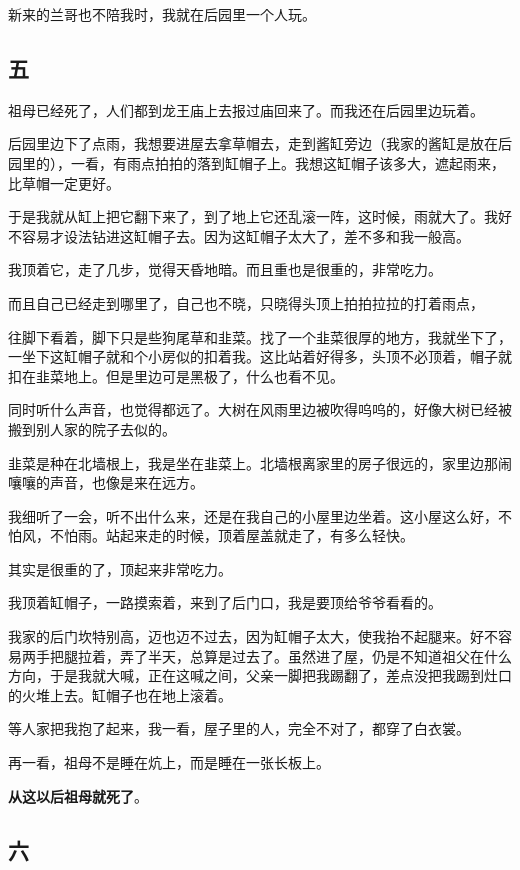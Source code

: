 \documentclass[UTF8]{ctexart}
\begin{document}
新来的兰哥也不陪我时，我就在后园里一个人玩。

\subsection{五}

祖母已经死了，人们都到龙王庙上去报过庙回来了。而我还在后园里边玩着。

后园里边下了点雨，我想要进屋去拿草帽去，走到酱缸旁边（我家的酱缸是放在后园里的），一看，有雨点拍拍的落到缸帽子上。我想这缸帽子该多大，遮起雨来，比草帽一定更好。

于是我就从缸上把它翻下来了，到了地上它还乱滚一阵，这时候，雨就大了。我好不容易才设法钻进这缸帽子去。因为这缸帽子太大了，差不多和我一般高。

我顶着它，走了几步，觉得天昏地暗。而且重也是很重的，非常吃力。

而且自己已经走到哪里了，自己也不晓，只晓得头顶上拍拍拉拉的打着雨点，

往脚下看着，脚下只是些狗尾草和韭菜。找了一个韭菜很厚的地方，我就坐下了，一坐下这缸帽子就和个小房似的扣着我。这比站着好得多，头顶不必顶着，帽子就扣在韭菜地上。但是里边可是黑极了，什么也看不见。

同时听什么声音，也觉得都远了。大树在风雨里边被吹得呜呜的，好像大树已经被搬到别人家的院子去似的。

韭菜是种在北墙根上，我是坐在韭菜上。北墙根离家里的房子很远的，家里边那闹嚷嚷的声音，也像是来在远方。

我细听了一会，听不出什么来，还是在我自己的小屋里边坐着。这小屋这么好，不怕风，不怕雨。站起来走的时候，顶着屋盖就走了，有多么轻快。

其实是很重的了，顶起来非常吃力。

我顶着缸帽子，一路摸索着，来到了后门口，我是要顶给爷爷看看的。

我家的后门坎特别高，迈也迈不过去，因为缸帽子太大，使我抬不起腿来。好不容易两手把腿拉着，弄了半天，总算是过去了。虽然进了屋，仍是不知道祖父在什么方向，于是我就大喊，正在这喊之间，父亲一脚把我踢翻了，差点没把我踢到灶口的火堆上去。缸帽子也在地上滚着。

等人家把我抱了起来，我一看，屋子里的人，完全不对了，都穿了白衣裳。

再一看，祖母不是睡在炕上，而是睡在一张长板上。

\textbf{从这以后祖母就死了}。

\subsection{六}
\end{document}
